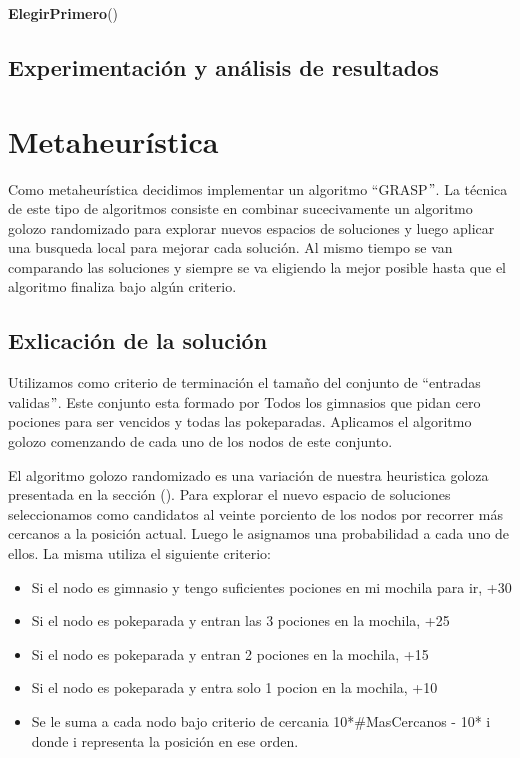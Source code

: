 \documentclass[spanish,12pt]{article}
\begin{document}
\begin{algorithm}[H]{\textbf{ElegirPrimero}()}
\subsection{Experimentación y análisis de resultados}



\section{Metaheurística}

Como metaheurística decidimos implementar un algoritmo ``GRASP$"$.
La técnica de este tipo de algoritmos consiste en combinar sucecivamente un algoritmo golozo randomizado para explorar nuevos espacios de soluciones y luego aplicar una busqueda local para mejorar cada solución. Al mismo tiempo se van comparando las soluciones y siempre se va eligiendo la mejor posible hasta que el algoritmo finaliza bajo algún criterio.

\subsection{Exlicación de la solución}

Utilizamos como criterio de terminación el tamaño del conjunto de ``entradas validas$"$. Este conjunto esta formado por Todos los gimnasios que pidan cero pociones para ser vencidos y todas las pokeparadas. Aplicamos el algoritmo golozo comenzando de cada uno de los nodos de este conjunto. 

El algoritmo golozo randomizado es una variación de nuestra heuristica goloza presentada en la sección (). %
Para explorar el nuevo espacio de soluciones seleccionamos como candidatos al veinte porciento de los nodos por recorrer más cercanos a la posición actual.
Luego le asignamos una probabilidad a cada uno de ellos. La misma utiliza el siguiente criterio:

\begin{itemize}
	\item Si el nodo es gimnasio y tengo suficientes pociones en mi mochila para ir, +30
	\item Si el nodo es pokeparada y entran las 3 pociones en la mochila, +25
	\item Si el nodo es pokeparada y entran 2 pociones en la mochila, +15
	\item Si el nodo es pokeparada y entra solo 1 pocion en la mochila, +10
	\item Se le suma a cada nodo  bajo criterio de cercania 10*$\# $MasCercanos - 10* i donde i representa la posición en ese orden.
\end{itemize} 


\end{algorithm}
\end{document}
